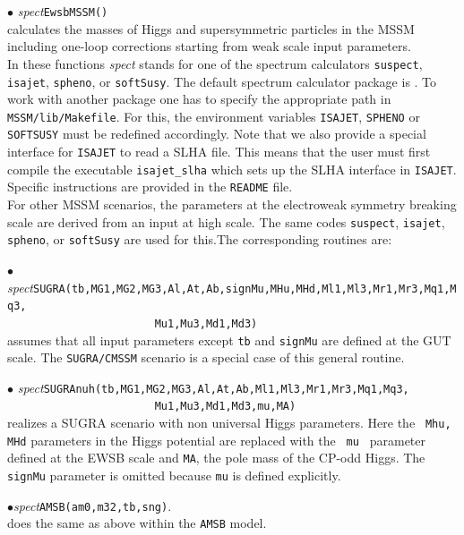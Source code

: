 \documentclass[12pt,a4paper]{article}
\begin{document}
\noindent $\bullet$ {\it spect}\verb|EwsbMSSM()|\\
 calculates the  masses of Higgs  and
supersymmetric particles in the MSSM including one-loop
corrections starting from weak scale input parameters. \\
In these functions {\it spect} stands for one of
the spectrum calculators {\tt suspect}, {\tt isajet},
{\tt spheno}, or {\tt softSusy}.
The  default spectrum calculator package is {\suspect}. To work
with another package one has to specify the appropriate path in
\verb|MSSM/lib/Makefile|. For this,  the environment variables
\verb|ISAJET|, \verb|SPHENO| or \verb|SOFTSUSY| must be redefined
accordingly. Note that we also provide a special interface for
\verb|ISAJET| to read a SLHA file. This means that the user must
first compile the executable \verb|isajet_slha| which sets up the  SLHA 
interface in  {\tt ISAJET}. Specific instructions are provided in the \verb|README| file.\\
 

For other MSSM scenarios, the   parameters at the electroweak symmetry breaking scale are derived from 
an  input at high scale. The same codes {\tt suspect}, {\tt isajet},
{\tt spheno}, or {\tt softSusy} are used for this.The corresponding
routines are:

\noindent $\bullet$ {\it
spect}\verb|SUGRA(tb,MG1,MG2,MG3,Al,At,Ab,signMu,MHu,MHd,Ml1,Ml3,Mr1,Mr3,Mq1,Mq3,|\\
\verb|                       Mu1,Mu3,Md1,Md3)|\\
assumes that  all input parameters except {\tt tb} and {\tt signMu}  are
defined at the GUT scale. The {\tt SUGRA/CMSSM} scenario is a special case of this general routine. 

\noindent $\bullet$ {\it
spect}\verb|SUGRAnuh(tb,MG1,MG2,MG3,Al,At,Ab,Ml1,Ml3,Mr1,Mr3,Mq1,Mq3,|\\
\verb|                       Mu1,Mu3,Md1,Md3,mu,MA)|\\
realizes a SUGRA scenario with non universal Higgs parameters. Here the {\tt
Mhu, MHd} parameters in the Higgs potential are replaced with the {\tt
mu } parameter defined at the  EWSB scale and {\tt MA}, the pole mass of the CP-odd Higgs. The
{\tt signMu} parameter is omitted  because {\tt mu} is defined
explicitly.

\noindent
$\bullet${\it spect}\verb|AMSB(am0,m32,tb,sng)|.\\
does  the same as above within the {\tt AMSB} model.\\
\end{document}
